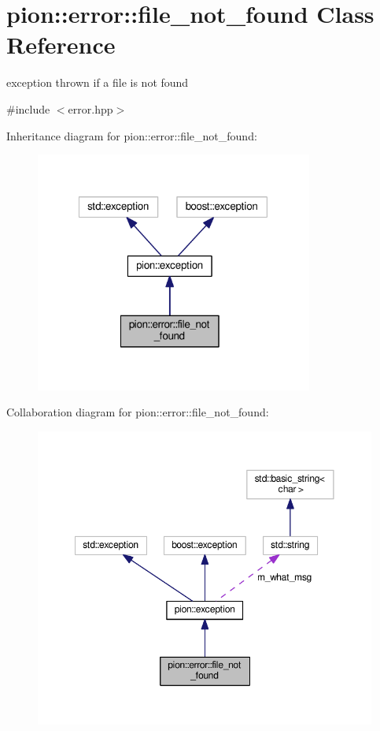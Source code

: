 \hypertarget{classpion_1_1error_1_1file__not__found}{\section{pion\-:\-:error\-:\-:file\-\_\-not\-\_\-found Class Reference}
\label{classpion_1_1error_1_1file__not__found}
}


exception thrown if a file is not found  




{\ttfamily \#include $<$error.\-hpp$>$}



Inheritance diagram for pion\-:\-:error\-:\-:file\-\_\-not\-\_\-found\-:
\nopagebreak
\begin{figure}[H]
\begin{center}
\leavevmode
\includegraphics[width=259pt]{classpion_1_1error_1_1file__not__found__inherit__graph}
\end{center}
\end{figure}


Collaboration diagram for pion\-:\-:error\-:\-:file\-\_\-not\-\_\-found\-:
\nopagebreak
\begin{figure}[H]
\begin{center}
\leavevmode
\includegraphics[width=350pt]{classpion_1_1error_1_1file__not__found__coll__graph}
\end{center}
\end{figure}
